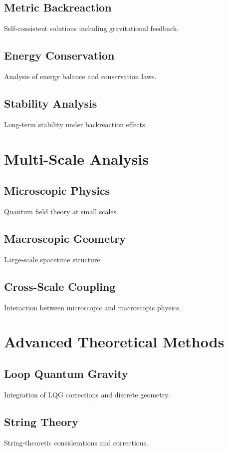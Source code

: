 \documentclass{article}
\begin{document}
\subsection{Metric Backreaction}
Self-consistent solutions including gravitational feedback.

\subsection{Energy Conservation}
Analysis of energy balance and conservation laws.

\subsection{Stability Analysis}
Long-term stability under backreaction effects.

\section{Multi-Scale Analysis}

\subsection{Microscopic Physics}
Quantum field theory at small scales.

\subsection{Macroscopic Geometry}
Large-scale spacetime structure.

\subsection{Cross-Scale Coupling}
Interaction between microscopic and macroscopic physics.

\section{Advanced Theoretical Methods}

\subsection{Loop Quantum Gravity}
Integration of LQG corrections and discrete geometry.

\subsection{String Theory}
String-theoretic considerations and corrections.
\end{document}

